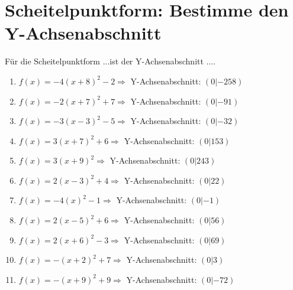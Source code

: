 \documentclass{article}%
\begin{document}
\section{Scheitelpunktform: Bestimme den Y{-}Achsenabschnitt}%
\label{sec:ScheitelpunktformBestimmedenY{-}Achsenabschnitt}%
Für die Scheitelpunktform ...ist der Y{-}Achsenabschnitt ....%
\begin{enumerate}[label=\alph*)]%
\item%
\newline\vspace{0.5cm}$f(x)=-4(x+8)^2 -2 \Rightarrow $ Y-Achsenabschnitt: $ (0|-258) $%
\item%
\newline\vspace{0.5cm}$f(x)=-2(x+7)^2 +7 \Rightarrow $ Y-Achsenabschnitt: $ (0|-91) $%
\item%
\newline\vspace{0.5cm}$f(x)=-3(x-3)^2 -5 \Rightarrow $ Y-Achsenabschnitt: $ (0|-32) $%
\item%
\newline\vspace{0.5cm}$f(x)=3(x+7)^2 +6 \Rightarrow $ Y-Achsenabschnitt: $ (0|153) $%
\item%
\newline\vspace{0.5cm}$f(x)=3(x+9)^2 \Rightarrow $ Y-Achsenabschnitt: $ (0|243) $%
\item%
\newline\vspace{0.5cm}$f(x)=2(x-3)^2 +4 \Rightarrow $ Y-Achsenabschnitt: $ (0|22) $%
\item%
\newline\vspace{0.5cm}$f(x)=-4(x)^2 -1 \Rightarrow $ Y-Achsenabschnitt: $ (0|-1) $%
\item%
\newline\vspace{0.5cm}$f(x)=2(x-5)^2 +6 \Rightarrow $ Y-Achsenabschnitt: $ (0|56) $%
\item%
\newline\vspace{0.5cm}$f(x)=2(x+6)^2 -3 \Rightarrow $ Y-Achsenabschnitt: $ (0|69) $%
\item%
\newline\vspace{0.5cm}$f(x)=-(x+2)^2 +7 \Rightarrow $ Y-Achsenabschnitt: $ (0|3) $%
\item%
\newline\vspace{0.5cm}$f(x)=-(x+9)^2 +9 \Rightarrow $ Y-Achsenabschnitt: $ (0|-72) $%

\end{enumerate}
\end{document}
